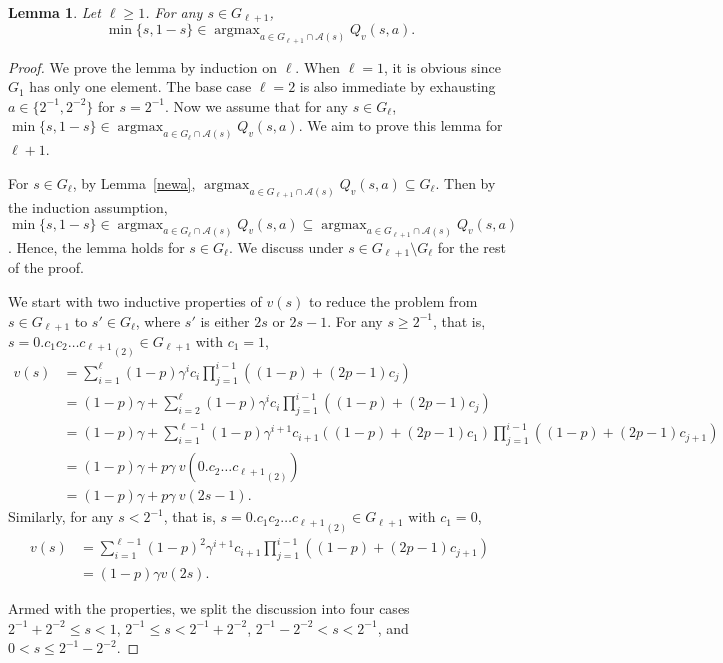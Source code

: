 \documentclass{article}
\newtheorem{lemma}[theorem]{Lemma}
\theoremstyle{named}
\DeclareMathOperator*{\argmax}{arg max}
\newcommand{\cA}{\mathcal{A}}
\begin{document}
\begin{lemma}
\label{induction}
Let $\ell\geq 1$. For any $s\in G_{\ell+1}$, 
\[\min\{s,1-s\} \in \argmax_{a\in G_{\ell+1}\cap \cA(s)}Q_v(s,a). \]
\end{lemma}

\begin{proof}
We prove the lemma by induction on $\ell$. When $\ell=1$, it is obvious since $G_{1}$ has only one element. The base case $\ell=2$ is also immediate by exhausting $a\in\{2^{-1}, 2^{-2}\}$ for $s=2^{-1}$. Now we assume that for any $s\in G_\ell$, $\min\{s,1-s\}\in\argmax_{a\in G_\ell\cap \cA(s)}Q_v(s,a)$. We aim to prove this lemma for $\ell+1$.

For $s\in G_\ell$, by Lemma~\ref{newa}, $\argmax_{a\in G_{\ell+1}\cap \cA(s)}Q_v(s,a)\subseteq G_\ell$. Then by the induction assumption, $\min\{s,1-s\}\in\argmax_{a\in G_{\ell}\cap \cA(s)}Q_v(s,a)\subseteq \argmax_{a\in G_{\ell+1}\cap \cA(s)}Q_v(s,a)$. Hence, the lemma holds for $s\in G_\ell$. We discuss under $s\in G_{\ell+1}\setminus G_\ell$ for the rest of the proof.

We start with two inductive properties of $v(s)$ to reduce the problem from $s\in G_{\ell+1}$ to $s'\in G_{\ell}$, where $s'$ is either $2s$ or $2s-1$. For any $s\geq 2^{-1}$, that is, $s={0.c_1c_2\dots c_{\ell+1}}_{(2)}\in G_{\ell+1}$ with $c_1=1$,
\begin{align*}
v(s) &= \sum_{i=1}^\ell (1-p)\gamma^i c_i\prod_{j=1}^{i-1}((1-p)+(2p-1)c_j) \\
&= (1-p)\gamma + \sum_{i=2}^\ell (1-p)\gamma^i c_i\prod_{j=1}^{i-1}((1-p)+(2p-1)c_j) \\
&= (1-p)\gamma + \sum_{i=1}^{\ell-1} (1-p)\gamma^{i+1} c_{i+1}((1-p)+(2p-1)c_{1})\prod_{j=1}^{i-1}((1-p)+(2p-1)c_{j+1}) \\
&= (1-p)\gamma + p\gamma\ v({0.c_2\dots c_{\ell+1}}_{(2)}) \\
&= (1-p)\gamma + p\gamma\ v(2s-1).
\end{align*}
Similarly, for any $s< 2^{-1}$, that is, $s={0.c_1c_2\dots c_{\ell+1}}_{(2)}\in G_{\ell+1}$ with $c_1=0$,
\begin{align*}
v(s) & = \sum_{i=1}^{\ell-1} (1-p)^2\gamma^{i+1} c_{i+1}\prod_{j=1}^{i-1}((1-p)+(2p-1)c_{j+1}) \\
& = (1-p)\gamma v(2s).
\end{align*}

Armed with the properties, we split the discussion into four cases $2^{-1}+2^{-2}\le s < 1$, $2^{-1} \le s < 2^{-1}+2^{-2}$, $2^{-1}-2^{-2} < s < 2^{-1}$, and $0<s \le 2^{-1}-2^{-2}$.


\end{proof}
\end{document}
